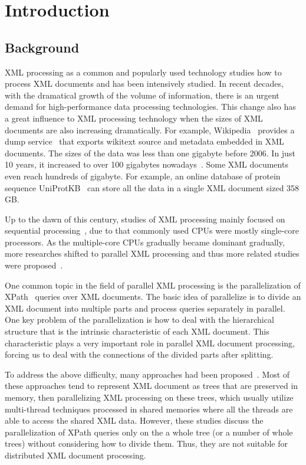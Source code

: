 
\chapter{Introduction}

\section{Background}

XML processing as a common and popularly used technology studies how to process 
XML documents and has been intensively studied. 
In recent decades, with the dramatical growth of the volume of information, 
there is an urgent demand for high-performance data processing technologies. 
This change also has a great  influence to XML processing
technology when the sizes of XML documents are also increasing dramatically. 
For example, Wikipedia~\cite{wiki} provides a dump service~\cite{wikipediadump} that
exports wikitext source and metadata embedded in XML documents. The sizes of the
data was less than one gigabyte before 2006. In just 10 years, it increased to
over 100 gigabytes nowadays~\cite{wikisize}. Some XML documents even reach
hundreds of gigabyte. For example, an online database of protein sequence
UniProtKB~\cite{UniProtKB} can store all the data in a single XML document sized
358 GB.

Up to the dawn of this century, studies of XML processing mainly focused
on sequential processing~\cite{Skil97,AlJYK02,Ne02,ToGr02,HAJR03},  due to that
commonly used CPUs were mostly single-core processors. As the multiple-core CPUs
gradually became dominant gradually,  more researches shifted to parallel XML
processing  and thus more related studies were
proposed~\cite{SAFu05,PaZC08,LFLQ08,ZhPC10}.

One common topic in the field of parallel XML processing is the parallelization
of XPath~\cite{xpath} queries over XML documents. The basic idea of parallelize
is to divide an XML document into multiple parts and process queries separately
in parallel. One key problem of the parallelization is how to deal with the
hierarchical structure that is the intrinsic characteristic of each XML
document. This characteristic plays a very important role in parallel XML
document processing, forcing us to deal with the connections of the divided
parts after splitting. 

To address the above difficulty, many approaches had been proposed~\cite{JLWO03,
	SAFu05,NEMH07,BuLM08,Mats09, ZhPC10,ChLW13,HaMa16}. Most of these approaches
tend to represent XML document as trees that are preserved in memory, then
parallelizing XML processing on these trees, which usually utilize multi-thread
techniques processed in shared memories where all the threads are able to access
the shared XML data. However, these studies discuss the parallelization of XPath
queries only on the a whole tree (or a number of whole trees) without
considering how to divide them. Thus, they are not suitable for distributed XML
document processing.

